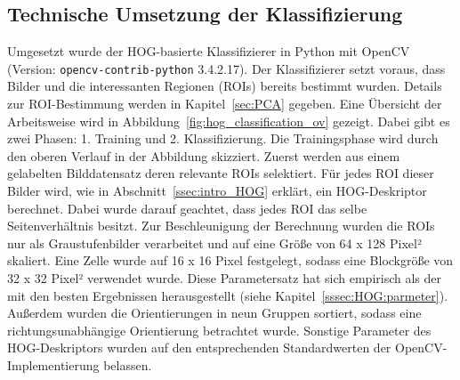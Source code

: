 \subsection{Technische Umsetzung der Klassifizierung} \label{ssec:implementation}
Umgesetzt wurde der HOG-basierte Klassifizierer in Python mit OpenCV (Version: \texttt{opencv-contrib-python} 3.4.2.17). Der Klassifizierer setzt voraus, dass Bilder und die interessanten Regionen (ROIs) bereits bestimmt wurden. Details zur ROI-Bestimmung werden in Kapitel~\ref{sec:PCA} gegeben. Eine Übersicht der Arbeitsweise wird in Abbildung~\ref{fig:hog_classification_ov} gezeigt. Dabei gibt es zwei Phasen: 1. Training und 2. Klassifizierung. Die Trainingsphase wird durch den oberen Verlauf in der Abbildung skizziert. Zuerst werden aus einem gelabelten Bilddatensatz deren relevante ROIs selektiert. Für jedes ROI dieser Bilder wird, wie in Abschnitt~\ref{ssec:intro_HOG} erklärt, ein HOG-Deskriptor berechnet. Dabei wurde darauf geachtet, dass jedes ROI das selbe Seitenverhältnis besitzt. Zur Beschleunigung der Berechnung wurden die ROIs nur als Graustufenbilder verarbeitet und auf eine Größe von 64 x 128 Pixel² skaliert. Eine Zelle wurde auf 16 x 16 Pixel festgelegt, sodass eine Blockgröße von 32 x 32 Pixel² verwendet wurde. Diese Parametersatz hat sich empirisch als der mit den besten Ergebnissen herausgestellt (siehe Kapitel~\ref{sssec:HOG:parmeter}). Außerdem wurden die Orientierungen in neun Gruppen sortiert, sodass eine richtungsunabhängige Orientierung betrachtet wurde. Sonstige Parameter des HOG-Deskriptors wurden auf den entsprechenden Standardwerten der OpenCV-Implementierung belassen.

